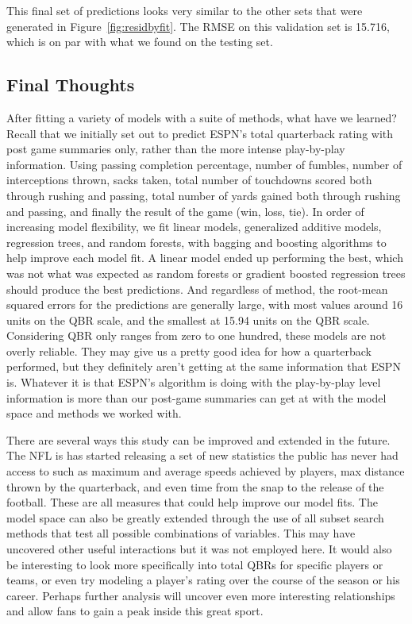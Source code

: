 \documentclass[12pt]{article}\usepackage[]{graphicx}\usepackage[]{color}
\begin{document}
\noindent
This final set of predictions looks very similar to the other sets that were generated in Figure~\ref{fig:residbyfit}. The RMSE on this validation set is 15.716, which is on par with what we found on the testing set.

\subsection{Final Thoughts}
After fitting a variety of models with a suite of methods, what have we learned? Recall that we initially set out to predict ESPN's total quarterback rating with post game summaries only, rather than the more intense play-by-play information. Using passing completion percentage, number of fumbles, number of interceptions thrown, sacks taken, total number of touchdowns scored both through rushing and passing, total number of yards gained both through rushing and passing, and finally the result of the game (win, loss, tie). In order of increasing model flexibility, we fit linear models, generalized additive models, regression trees, and random forests, with bagging and boosting algorithms to help improve each model fit. A linear model ended up performing the best, which was not what was expected as random forests or gradient boosted regression trees should produce the best predictions. And regardless of method, the root-mean squared errors for the predictions are generally large, with most values around 16 units on the QBR scale, and the smallest at 15.94 units on the QBR scale. Considering QBR only ranges from zero to one hundred, these models are not overly reliable. They may give us a pretty good idea for how a quarterback performed, but they definitely aren't getting at the same information that ESPN is. Whatever it is that ESPN's algorithm is doing with the play-by-play level information is more than our post-game summaries can get at with the model space and methods we worked with. 

There are several ways this study can be improved and extended in the future. The NFL is has started releasing a set of new statistics the public has never had access to such as maximum and average speeds achieved by players, max distance thrown by the quarterback, and even time from the snap to the release of the football. These are all measures that could help improve our model fits. The model space can also be greatly extended through the use of all subset search methods that test all possible combinations of variables. This may have uncovered other useful interactions but it was not employed here. It would also be interesting to look more specifically into total QBRs for specific players or teams, or even try modeling a player's rating over the course of the season or his career. Perhaps further analysis will uncover even more interesting relationships and allow fans to gain a peak inside this great sport.
\end{document}
